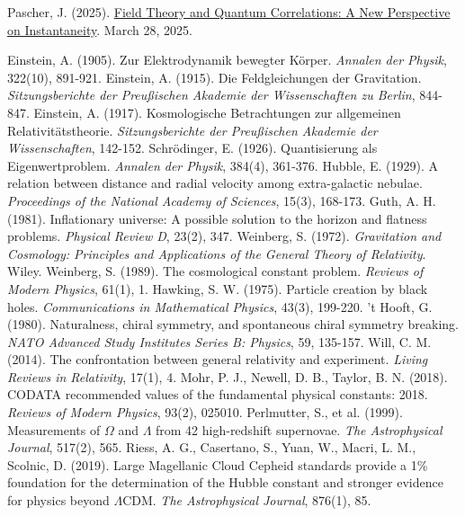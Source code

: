 \documentclass[12pt,a4paper]{article}
\begin{document}
\begin{thebibliography}{99}
		 Pascher, J. (2025). \href{https://github.com/jpascher/T0-Time-Mass-Duality/tree/main/2/pdf/English/FeldtheorieQuantenEn.pdf}{Field Theory and Quantum Correlations: A New Perspective on Instantaneity}. March 28, 2025.
		
		 Einstein, A. (1905). Zur Elektrodynamik bewegter Körper. \textit{Annalen der Physik}, 322(10), 891-921.
		 Einstein, A. (1915). Die Feldgleichungen der Gravitation. \textit{Sitzungsberichte der Preußischen Akademie der Wissenschaften zu Berlin}, 844-847.
		 Einstein, A. (1917). Kosmologische Betrachtungen zur allgemeinen Relativitätstheorie. \textit{Sitzungsberichte der Preußischen Akademie der Wissenschaften}, 142-152.
		 Schrödinger, E. (1926). Quantisierung als Eigenwertproblem. \textit{Annalen der Physik}, 384(4), 361-376.
		 Hubble, E. (1929). A relation between distance and radial velocity among extra-galactic nebulae. \textit{Proceedings of the National Academy of Sciences}, 15(3), 168-173.
		 Guth, A. H. (1981). Inflationary universe: A possible solution to the horizon and flatness problems. \textit{Physical Review D}, 23(2), 347.
		 Weinberg, S. (1972). \textit{Gravitation and Cosmology: Principles and Applications of the General Theory of Relativity}. Wiley.
		 Weinberg, S. (1989). The cosmological constant problem. \textit{Reviews of Modern Physics}, 61(1), 1.
		 Hawking, S. W. (1975). Particle creation by black holes. \textit{Communications in Mathematical Physics}, 43(3), 199-220.
		 't Hooft, G. (1980). Naturalness, chiral symmetry, and spontaneous chiral symmetry breaking. \textit{NATO Advanced Study Institutes Series B: Physics}, 59, 135-157.
		 Will, C. M. (2014). The confrontation between general relativity and experiment. \textit{Living Reviews in Relativity}, 17(1), 4.
		 Mohr, P. J., Newell, D. B., Taylor, B. N. (2018). CODATA recommended values of the fundamental physical constants: 2018. \textit{Reviews of Modern Physics}, 93(2), 025010.
		 Perlmutter, S., et al. (1999). Measurements of $\Omega$ and $\Lambda$ from 42 high-redshift supernovae. \textit{The Astrophysical Journal}, 517(2), 565.
		 Riess, A. G., Casertano, S., Yuan, W., Macri, L. M., Scolnic, D. (2019). Large Magellanic Cloud Cepheid standards provide a 1\% foundation for the determination of the Hubble constant and stronger evidence for physics beyond $\Lambda$CDM. \textit{The Astrophysical Journal}, 876(1), 85.

\end{thebibliography}
\end{document}
